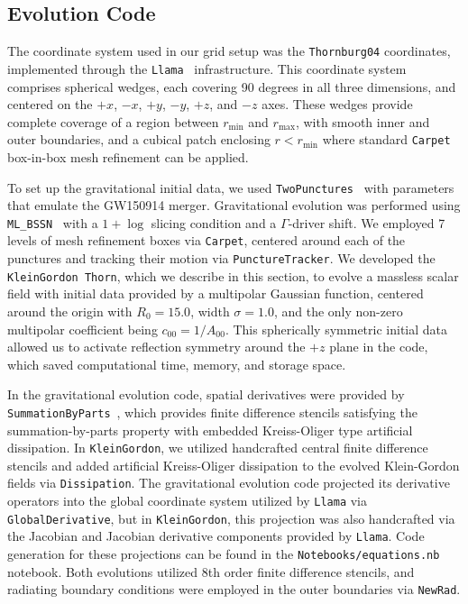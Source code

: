 \subsection{Evolution Code}

The coordinate system used in our grid setup was the \texttt{Thornburg04} coordinates, implemented through the \texttt{Llama}~\cite{PhysRevD.83.044045} infrastructure. This coordinate system comprises spherical wedges, each covering 90 degrees in all three dimensions, and centered on the $+x$, $-x$, $+y$, $-y$, $+z$, and $-z$ axes. These wedges provide complete coverage of a region between $r_\text{min}$ and $r_\text{max}$, with smooth inner and outer boundaries, and a cubical patch enclosing $r < r_\text{min}$ where standard \texttt{Carpet}~\cite{Schnetter:2003rb} box-in-box mesh refinement can be applied.

To set up the gravitational initial data, we used \texttt{TwoPunctures}~\cite{Ansorg:2004ds} with parameters that emulate the GW150914 merger. Gravitational evolution was performed using \texttt{ML\_BSSN}~\cite{Brown:2008sb,Kranc:web,McLachlan:web} with a $1+\log$ slicing condition and a $\Gamma$-driver shift. We employed 7 levels of mesh refinement boxes via \texttt{Carpet}, centered around each of the punctures and tracking their motion via \texttt{PunctureTracker}. We developed the \texttt{KleinGordon Thorn}, which we describe in this section, to evolve a massless scalar field with initial data provided by a multipolar Gaussian function, centered around the origin with $R_0 = 15.0$, width $\sigma = 1.0$, and the only non-zero multipolar coefficient being $c_{00} = 1 / A_{00}$. This spherically symmetric initial data allowed us to activate reflection symmetry around the $+z$ plane in the code, which saved computational time, memory, and storage space.

In the gravitational evolution code, spatial derivatives were provided by \texttt{SummationByParts}~\cite{Diener:2005tn}, which provides finite difference stencils satisfying the summation-by-parts property with embedded Kreiss-Oliger type artificial dissipation. In \texttt{KleinGordon}, we utilized handcrafted central finite difference stencils and added artificial Kreiss-Oliger dissipation to the evolved Klein-Gordon fields via \texttt{Dissipation}. The gravitational evolution code projected its derivative operators into the global coordinate system utilized by \texttt{Llama} via \texttt{GlobalDerivative}, but in \texttt{KleinGordon}, this projection was also handcrafted via the Jacobian and Jacobian derivative components provided by \texttt{Llama}. Code generation for these projections can be found in the \texttt{Notebooks/equations.nb} notebook. Both evolutions utilized 8th order finite difference stencils, and radiating boundary conditions were employed in the outer boundaries via \texttt{NewRad}.

